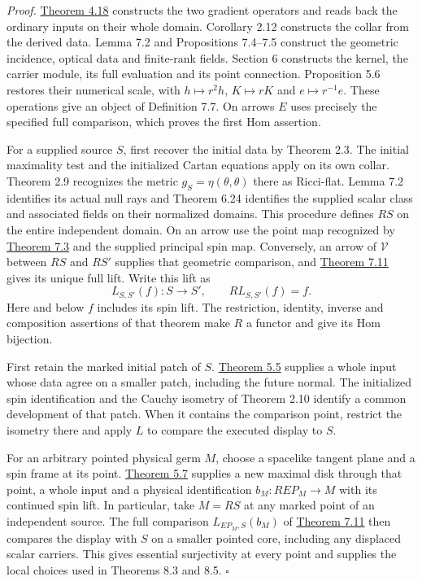 \documentclass[
  english,
  11pt,
  reqno]{amsart}
\begin{document}
\emph{Proof.}
\hyperref[thm:online-ordinary-negative-response-initial-source]{Theorem
4.18} constructs the two gradient operators and reads back the ordinary
inputs on their whole domain. Corollary 2.12 constructs the collar from
the derived data. Lemma 7.2 and Propositions 7.4--7.5 construct the
geometric incidence, optical data and finite-rank fields. Section 6
constructs the kernel, the carrier module, its full evaluation and its
point connection. Proposition 5.6 restores their numerical scale, with
\(h\mapsto r^2h\), \(K\mapsto rK\) and \(e\mapsto r^{-1}e\). These
operations give an object of Definition 7.7. On arrows \(E\) uses
precisely the specified full comparison, which proves the first Hom
assertion.

For a supplied source \(S\), first recover the initial data by Theorem
2.3. The initial maximality test and the initialized Cartan equations
apply on its own collar. Theorem 2.9 recognizes the metric
\(g_S=\eta(\theta,\theta)\) there as Ricci-flat. Lemma 7.2 identifies
its actual null rays and Theorem 6.24 identifies the supplied scalar
class and associated fields on their normalized domains. This procedure
defines \(R S\) on the entire independent domain. On an arrow use the
point map recognized by
\hyperref[thm:online-incidence-physical-recognition]{Theorem 7.3} and
the supplied principal spin map. Conversely, an arrow of \(\mathcal V\)
between \(R S\) and \(R S'\) supplies that geometric comparison, and
\hyperref[thm:online-full-unmarked-source-hom]{Theorem 7.11} gives its
unique full lift. Write this lift as%
 \[
L_{S,S'}(f):S\longrightarrow S',\qquad R L_{S,S'}(f)=f .
\] Here and below \(f\) includes its spin lift. The restriction,
identity, inverse and composition assertions of that theorem make \(R\)
a functor and give its Hom bijection.

First retain the marked initial patch of \(S\).
\hyperref[thm:submission-marked-initial-coverage]{Theorem 5.5} supplies
a whole input whose data agree on a smaller patch, including the future
normal. The initialized spin identification and the Cauchy isometry of
Theorem 2.10 identify a common development of that patch. When it
contains the comparison point, restrict the isometry there and apply
\(L\) to compare the executed display to \(S\).

For an arbitrary pointed physical germ \(M\), choose a spacelike tangent
plane and a spin frame at its point.
\hyperref[thm:submission-vacuum-germ-coverage]{Theorem 5.7} supplies a
new maximal disk through that point, a whole input and a physical
identification \(b_M:R E P_M\to M\) with its continued spin lift. In
particular, take \(M=RS\) at any marked point of an independent source.
The full comparison \(L_{E P_M,S}(b_M)\) of
\hyperref[thm:online-full-unmarked-source-hom]{Theorem 7.11} then
compares the display with \(S\) on a smaller pointed core, including any
displaced scalar carriers. This gives essential surjectivity at every
point and supplies the local choices used in Theorems 8.3 and 8.5.
\hfill\(\square\)
\end{document}
